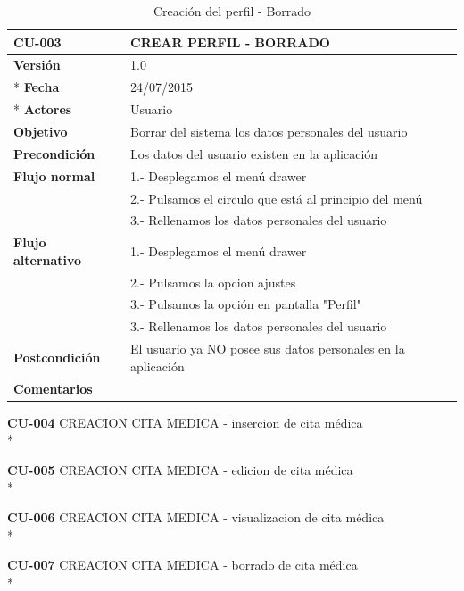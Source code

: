 \documentclass[../pfc.tex]{subfiles}
\begin{document}
	\begin{table}[!hbt]
		\centering
		\begin{tabular}[t]{|p{3cm}|p{9.5cm}|}
			\hline \textbf{CU-003} & \textbf{CREAR PERFIL - BORRADO} \\*
			\hline\hline \textbf{Versión} & 1.0 \\ *
			\hline\hline \textbf{Fecha} & 24/07/2015 \\ *
			\hline\textbf{Actores} 	& Usuario\\*
			\hline \textbf{Objetivo} & Borrar del sistema los datos personales del usuario\\* 			
			\hline \textbf{Precondición} & Los datos del usuario existen en la aplicación \\* 
			\hline \textbf{Flujo normal} & 1.- Desplegamos el menú drawer \\* 
			& 2.- Pulsamos el circulo que está al principio del menú \\*	
			& 3.- Rellenamos los datos personales del usuario\\*	
			\hline \textbf{Flujo alternativo} & 1.- Desplegamos el menú drawer \\* 
			& 2.- Pulsamos la opcion ajustes \\*	
			& 3.- Pulsamos la opción en pantalla "Perfil" \\*	
			& 3.- Rellenamos los datos personales del usuario \\*	
			\hline \textbf{Postcondición} & El usuario ya NO posee sus datos personales en la aplicación \\* 
			\hline \textbf{Comentarios}   &  \\*
			\hline
		\end{tabular}
		\caption{Creación del perfil - Borrado}
		\label{tabla:caso003}
	\end{table}
	
	
	
	
	
	
	
	\textbf{CU-004}	CREACION CITA MEDICA - insercion de cita médica\\*
	
	\textbf{CU-005}	CREACION CITA MEDICA - edicion de cita médica\\*
	
	\textbf{CU-006}	CREACION CITA MEDICA - visualizacion de cita médica\\*
	
	\textbf{CU-007}	CREACION CITA MEDICA - borrado de cita médica\\*
	
\end{document}
